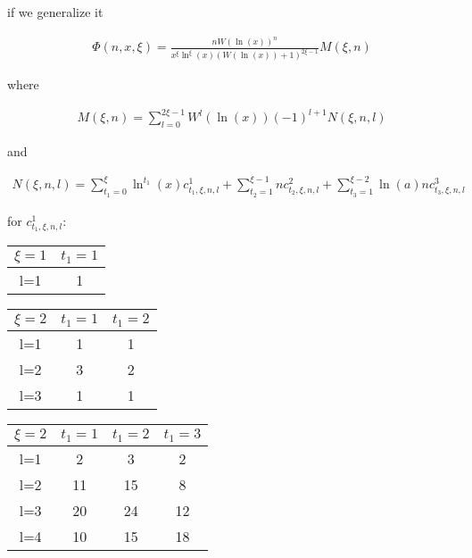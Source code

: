 if we generalize it

\begin{align}
	     \Phi(n, x, \xi) = \frac{nW(\ln(x))^n}{x^\xi\ln^\xi(x)(W(\ln(x))+1)^{2\xi-1}}M(\xi, n)
\end{align}

where

\begin{align}
	     M(\xi, n) = \sum_{l=0}^{2\xi-1}W^l(\ln(x))(-1)^{l+1}N(\xi, n, l)
\end{align}

and

\begin{align}
	     N(\xi, n, l) = \sum_{t_1=0}^\xi \ln^{t_1}(x)c^1_{t_1, \xi, n , l} +
	     \sum_{t_2=1}^{\xi-1}nc^2_{t_2, \xi, n, l}+\sum_{t_3=1}^{\xi-2}\ln(a)nc^3_{t_3, \xi, n, l}
\end{align}

\newpage

for \(c^1_{t_1, \xi, n, l}\):

\begin{table}[h!]
	     \centering
	     \begin{tabular}{||c| c ||} 
 	     	     \hline
	     	     \hline
	     	     \(\xi = 1\) & \(t_1=1\) \\ [0.5ex] 
	     	     \hline
	     	     l=1 & 1 \\ [1ex] 
	     	     \hline
	     	     \hline
	     \end{tabular}
\end{table}

\begin{table}[h!]
	     \centering
	     \begin{tabular}{||c| c c ||} 
	     	     \hline
	     	     \hline
	     	     \(\xi = 2\) & \(t_1=1\) & \(t_1=2\) \\ [0.5ex] 
	     	     \hline
	     	     l=1 & 1 & 1 \\ 
	     	     l=2 & 3 & 2\\
	     	     l=3 & 1 & 1\\[1ex] 
	     	     \hline
	     	     \hline
	     \end{tabular}
\end{table}

\begin{table}[h!]
	     \centering
	     \begin{tabular}{||c| c c c||} 
	     	     \hline
	     	     \hline
	     	     \(\xi = 2\) & \(t_1=1\) & \(t_1=2\) & \(t_1=3\) \\ [0.5ex] 
	     	     \hline
	     	     l=1 & 2 & 3 & 2\\ 
	     	     l=2 & 11 & 15 & 8\\
	     	     l=3 & 20 & 24 & 12\\
	     	     l=4 & 10 & 15 & 18\\[1ex] 
	     	     \hline
	     	     \hline
	     \end{tabular}
\end{table}

